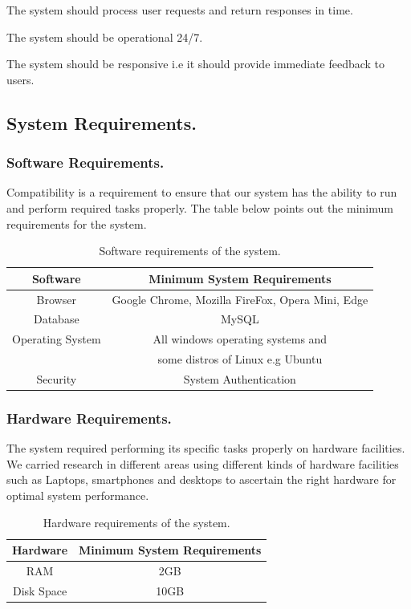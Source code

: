 \documentclass{article}
\begin{document}
The system should process user requests and return responses in time.

The system should be operational 24/7.

The system should be responsive i.e it should provide immediate feedback to users.

\subsection{System Requirements.}
\subsubsection{Software Requirements.}
Compatibility is a requirement to ensure that our system has the ability to run and perform required tasks properly. The table below points out the minimum requirements for the system.
\vspace{20pt}
\begin{table}[h]
    \centering
    \caption{Software requirements of the system.}
    
\begin{tabular}{|c|c|}
\hline
Software & Minimum System Requirements\\
 \hline  
 Browser & Google Chrome, Mozilla FireFox, Opera Mini, Edge\\
 \hline 
 Database & MySQL\\
 \hline 
 Operating System & All windows operating systems and\\ & some distros of Linux e.g Ubuntu\\
 \hline 
 Security  & System Authentication\\
 \hline
\end{tabular}

\label{tab: Software requirements of the system.}

\end{table}

\subsubsection{Hardware Requirements.}
The system required performing its specific tasks properly on hardware facilities. We carried research in different areas using different kinds of hardware facilities such as Laptops, smartphones and desktops to ascertain the right hardware for optimal system performance.

\vspace{10pt}
\begin{table}[h]
    \centering
    \caption{Hardware requirements of the system.}
    
    \begin{tabular}{|c|c|}
    \hline
    Hardware & Minimum System Requirements\\
     \hline  
     RAM & 2GB\\
     \hline 
     Disk Space & 10GB\\
     \hline
    \end{tabular}
    
    \label{tab: Software requirements of the system.}
\end{table}
\end{document}
